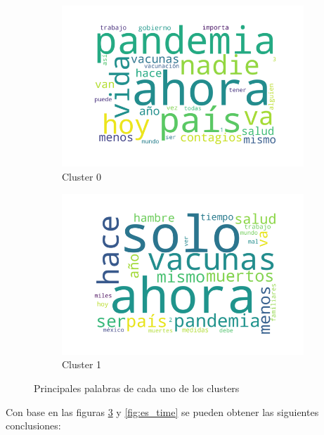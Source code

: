 \begin{figure}
     \centering
     \begin{subfigure}[b]{0.4\textwidth}
         \centering
         \includegraphics[width=\textwidth]{results/TopicDetection/es/cluster0.png}
         \caption{Cluster 0}
         \label{fig:es_c0}
     \end{subfigure}
     \hfill
     \begin{subfigure}[b]{0.4\textwidth}
         \centering
         \includegraphics[width=\textwidth]{results/TopicDetection/es/cluster1.png}
         \caption{Cluster 1}
         \label{fig:es_c1}
     \end{subfigure}
        \caption{Principales palabras de cada uno de los clusters}
        \label{fig:es_clusters}
\end{figure}

Con base en las figuras \ref{fig:es_clusters} y \ref{fig:es_time} se pueden obtener las siguientes conclusiones:
\begin{itemize}

\end{itemize}

